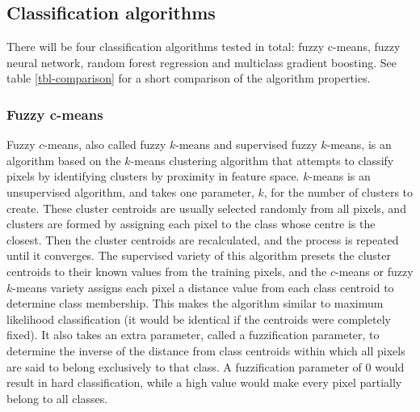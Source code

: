 \documentclass[a4paper,10pt]{article}
\begin{document}
\subsection{Classification algorithms}

There will be four classification algorithms tested in total: fuzzy c-means, fuzzy neural network, random forest regression and multiclass gradient boosting. See table \ref{tbl-comparison} for a short comparison of the algorithm properties.

\begin{table}
  \begin{center}
  \end{center}
  \caption{Feature comparison between classification algorithms whose classification accuracy will be compared in the thesis.}
  \label{tbl-comparison}
\end{table}

\subsubsection{Fuzzy c-means}

Fuzzy $c$-means, also called fuzzy $k$-means and supervised fuzzy $k$-means, is an algorithm based on the $k$-means clustering algorithm that attempts to classify pixels by identifying clusters by proximity in feature space. $k$-means is an unsupervised algorithm, and takes one parameter, $k$, for the number of clusters to create. These cluster centroids are usually selected randomly from all pixels, and clusters are formed by assigning each pixel to the class whose centre is the closest. Then the cluster centroids are recalculated, and the process is repeated until it converges. The supervised variety of this algorithm presets the cluster centroids to their known values from the training pixels, and the $c$-means or fuzzy $k$-means variety assigns each pixel a distance value from each class centroid to determine class membership. This makes the algorithm similar to maximum likelihood classification (it would be identical if the centroids were completely fixed). It also takes an extra parameter, called a fuzzification parameter, to determine the inverse of the distance from class centroids within which all pixels are said to belong exclusively to that class. A fuzzification parameter of 0 would result in hard classification, while a high value would make every pixel partially belong to all classes. \cite{hengl2004fuzzycmeans}
\end{document}
